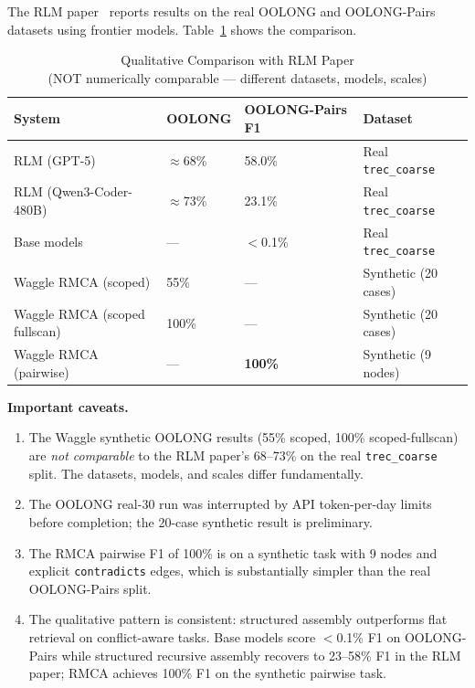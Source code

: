 \documentclass[conference]{IEEEtran}
\begin{document}
The RLM paper~\cite{zhang2026rlm} reports results on the real OOLONG and OOLONG-Pairs
datasets using frontier models. Table~\ref{tab:rlm_compare} shows the comparison.

\begin{table}[htbp]
\caption{Qualitative Comparison with RLM Paper\\
(NOT numerically comparable --- different datasets, models, scales)}
\label{tab:rlm_compare}
\centering
\begin{tabular}{p{2.8cm}p{1.5cm}p{1.5cm}p{1.2cm}}
\toprule
\textbf{System} & \textbf{OOLONG} & \textbf{OOLONG-Pairs F1} & \textbf{Dataset} \\
\midrule
RLM (GPT-5)~\cite{zhang2026rlm} & $\approx$68\% & 58.0\% & Real \texttt{trec\_coarse} \\
RLM (Qwen3-Coder-480B)~\cite{zhang2026rlm} & $\approx$73\% & 23.1\% & Real \texttt{trec\_coarse} \\
Base models~\cite{zhang2026rlm} & --- & $<$0.1\% & Real \texttt{trec\_coarse} \\
\midrule
Waggle RMCA (scoped) & 55\% & --- & Synthetic (20 cases) \\
Waggle RMCA (scoped fullscan) & 100\% & --- & Synthetic (20 cases) \\
Waggle RMCA (pairwise) & --- & \textbf{100\%} & Synthetic (9 nodes) \\
\bottomrule
\end{tabular}
\end{table}

\textbf{Important caveats.}
\begin{enumerate}
\item The Waggle synthetic OOLONG results (55\% scoped, 100\% scoped-fullscan) are
\emph{not comparable} to the RLM paper's 68--73\% on the real \texttt{trec\_coarse} split.
The datasets, models, and scales differ fundamentally.
\item The OOLONG real-30 run was interrupted by API token-per-day limits before completion;
the 20-case synthetic result is preliminary.
\item The RMCA pairwise F1 of 100\% is on a synthetic task with 9 nodes and explicit
\texttt{contradicts} edges, which is substantially simpler than the real OOLONG-Pairs split.
\item The qualitative pattern is consistent: structured assembly outperforms flat retrieval
on conflict-aware tasks. Base models score $<$0.1\% F1 on OOLONG-Pairs while structured
recursive assembly recovers to 23--58\% F1 in the RLM paper; RMCA achieves 100\% F1 on
the synthetic pairwise task.
\end{enumerate}
\end{document}

